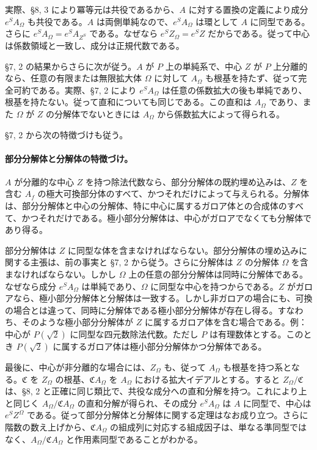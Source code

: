 実際、§8, 3 により冪等元は共役であるから、\(A\) に対する置換の定義により成分 \(e^S A_\Omega\) も共役である。\(A\) は両側単純なので、\(e^S A_\Omega\) は環として \(A\) に同型である。さらに \(e^SA_\Omega=e^S A_{Z^S}\) である。なぜなら \(e^S Z_\Omega=e^S Z\) だからである。従って中心は係数領域と一致し、成分は正規代数である。

§7, 2 の結果からさらに次が従う。\(A\) が \(P\) 上の単純系で、中心 \(Z\) が \(P\) 上分離的なら、任意の有限または無限拡大体 \(\Omega\) に対して \(A_\Omega\) も根基を持たず、従って完全可約である。実際、§7, 2 により \(e^S A_\Omega\) は任意の係数拡大の後も単純であり、根基を持たない。従って直和についても同じである。この直和は \(A_\Omega\) であり、また \(\Omega\) が \(Z\) の分解体でないときには \(A_\Omega\) から係数拡大によって得られる。

§7, 2 から次の特徴づけも従う。

\paragraph{部分分解体と分解体の特徴づけ。}
\(A\) が分離的な中心 \(Z\) を持つ除法代数なら、部分分解体の既約埋め込みは、\(Z\) を含む \(A_f\) の極大可換部分体のすべて、かつそれだけによって与えられる。分解体は、部分分解体と中心の分解体、特に中心に属するガロア体との合成体のすべて、かつそれだけである。極小部分分解体は、中心がガロアでなくても分解体であり得る。

部分分解体は \(Z\) に同型な体を含まなければならない。部分分解体の埋め込みに関する主張は、前の事実と §7, 2 から従う。さらに分解体は \(Z\) の分解体 \(\Omega\) を含まなければならない。しかし \(\Omega\) 上の任意の部分分解体は同時に分解体である。なぜなら成分 \(e^S A_\Omega\) は単純であり、\(\Omega\) に同型な中心を持つからである。\(Z\) がガロアなら、極小部分分解体と分解体は一致する。しかし非ガロアの場合にも、可換の場合とは違って、同時に分解体である極小部分分解体が存在し得る。すなわち、そのような極小部分分解体が \(Z\) に属するガロア体を含む場合である。例：中心が \(P(\sqrt2)\) に同型な四元数除法代数。ただし \(P\) は有理数体とする。このとき \(P(\sqrt2)\) に属するガロア体は極小部分分解体かつ分解体である。

最後に、中心が非分離的な場合には、\(Z_\Omega\) も、従って \(A_\Omega\) も根基を持つ系となる。\(\mathfrak C\) を \(Z_\Omega\) の根基、\(\mathfrak C A_\Omega\) を \(A_\Omega\) における拡大イデアルとする。すると \(Z_\Omega/\mathfrak C\) は、§8, 2 と正確に同じ類比で、共役な成分への直和分解を持つ。これにより上と同じく \(A_\Omega/\mathfrak C A_\Omega\) の直和分解が得られ、その成分 \(e^SA_\Omega\) は \(A\) に同型で、中心は \(e^SZ^\Omega\) である。従って部分分解体と分解体に関する定理はなお成り立つ。さらに階数の数え上げから、\(\mathfrak C A_\Omega\) の組成列に対応する組成因子は、単なる準同型ではなく、\(A_\Omega/\mathfrak C A_\Omega\) と作用素同型であることがわかる。

